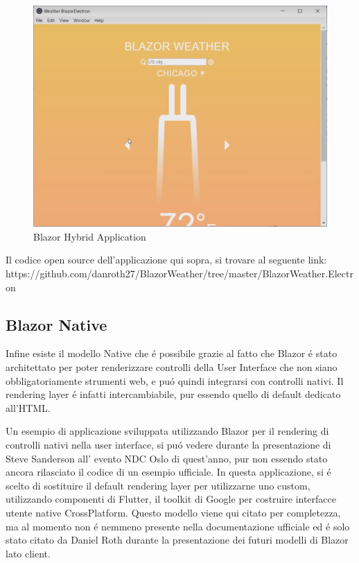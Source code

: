 \begin{figure}[H]
	\centerline{\includegraphics[scale=0.6]{figure/BlazorWeatherElectron.png}}
	\caption{Blazor Hybrid Application}
	\label{fig:BlazorHybridApplication}
\end{figure}

Il codice open source dell'applicazione qui sopra, si trovare al seguente link: https://github.com/danroth27/BlazorWeather/tree/master/BlazorWeather.Electron
\pagebreak



\subsection{Blazor Native}\label{sez:bnative}
Infine esiste il modello Native che \'e possibile grazie al fatto che Blazor \'e stato architettato per poter renderizzare controlli della User Interface che non siano obbligatoriamente strumenti web, e pu\'o quindi integrarsi con controlli nativi.
Il rendering layer \'e infatti intercambiabile, pur essendo quello di default dedicato all'HTML.

Un esempio di applicazione sviluppata utilizzando Blazor per il rendering di controlli nativi nella user interface, si pu\'o vedere durante la presentazione di Steve Sanderson all' evento NDC Oslo di quest'anno, pur non essendo stato ancora rilasciato il codice di un esempio ufficiale.\cite{sandersonNDCBlutter}
In questa applicazione, si \'e scelto di sostituire il default rendering layer per utilizzarne uno custom, utilizzando componenti di Flutter, il toolkit di Google per costruire interfacce utente native CrossPlatform.
Questo modello viene qui citato per completezza, ma al momento non \'e nemmeno presente nella documentazione ufficiale ed \'e solo stato citato da Daniel Roth durante la presentazione dei futuri modelli di Blazor lato client.\cite{blazorNative}
\pagebreak